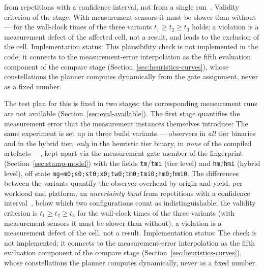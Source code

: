 \begin{nurlang}
from repetitions with a confidence interval, not from a single run~\cite{georges2007rigorous}.
Validity criterion of the stage: With measurement sensors it must be slower than without --- for the
wall-clock times of the three variants $t_1 \ge t_2 \ge t_3$ holds; a violation is a measurement
defect of the affected cell, not a result, and leads to the exclusion of the cell. Implementation
status: This plausibility check is not implemented in the code; it connects to the measurement-error
interpolation as the fifth evaluation component of the compare stage
(Section~\ref{sec:heuristics-curves}), whose constellations the planner computes dynamically from the
gate assignment, never as a fixed number.
\end{nurlang}
\begin{nurkurz}
The test plan for this is fixed in two stages; the corresponding measurement runs are not available
(Section~\ref{sec:eval-available}). The first stage quantifies the measurement error that the measurement
instances themselves introduce: The same experiment is set up in three build variants --- observers in
\emph{all} tier binaries and in the hybrid tier, \emph{only} in the heuristic tier binary, in \emph{none} of
the compiled artefacts ---, kept apart via the measurement-gate member of the fingerprint
(Section~\ref{sec:stamp-model}) with the fields \texttt{tm}/\texttt{tmi} (tier level) and
\texttt{hm}/\texttt{hmi} (hybrid level), off state \texttt{mg=m0;s0;st0;x0;tw0;tm0;tmi0;hm0;hmi0}. The
differences between the variants quantify the observer overhead by origin and yield, per workload and
platform, an \emph{uncertainty band} from repetitions with a confidence interval~\cite{georges2007rigorous},
below which two configurations count as indistinguishable; the validity criterion is $t_1 \ge t_2 \ge t_3$
for the wall-clock times of the three variants (with measurement sensors it must be slower than without), a
violation is a measurement defect of the cell, not a result. Implementation status: The check is not
implemented; it connects to the measurement-error interpolation as the fifth evaluation component of the
compare stage (Section~\ref{sec:heuristics-curves}), whose constellations the planner computes dynamically,
never as a fixed number.
\end{nurkurz}

